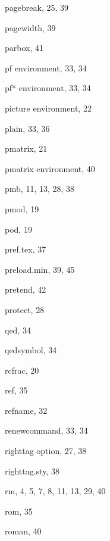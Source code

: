 \begin{theindex}
  \item {\ptt \bslash pagebreak}, 25, 39
  \item {\ptt \bslash pagewidth}, 39
  \item {\ptt \bslash parbox}, 41
  \item {\ptt {}pf} environment, 33, 34
  \item {\ptt {}pf*} environment, 33, 34
  \item {\ptt {}picture} environment, 22
  \item {\ptt {}plain}, 33, 36
  \item {\ptt \bslash pmatrix}, 21
  \item {\ptt {}pmatrix} environment, 40
  \item {\ptt \bslash pmb}, 11, 13, 28, 38
  \item {\ptt \bslash pmod}, 19
  \item {\ptt \bslash pod}, 19
  \item {\ptt {}pref.tex}, 37
  \item {\ptt {}preload.min}, 39, 45
  \item {\ptt \bslash pretend}, 42
  \item {\ptt \bslash protect}, 28

  \indexspace

  \item {\ptt \bslash qed}, 34
  \item {\ptt \bslash qedsymbol}, 34

  \indexspace

  \item {\ptt \bslash rcfrac}, 20
  \item {\ptt \bslash ref}, 35
  \item {\ptt \bslash refname}, 32
  \item {\ptt \bslash renewcommand}, 33, 34
  \item {\ptt {}righttag} option, 27, 38
  \item {\ptt {}righttag.sty}, 38
  \item {\ptt \bslash rm}, 4, 5, 7, 8, 11, 13, 29, 40
  \item {\ptt \bslash rom}, 35
  \item {\ptt \bslash roman}, 40

  \indexspace


\end{theindex}
